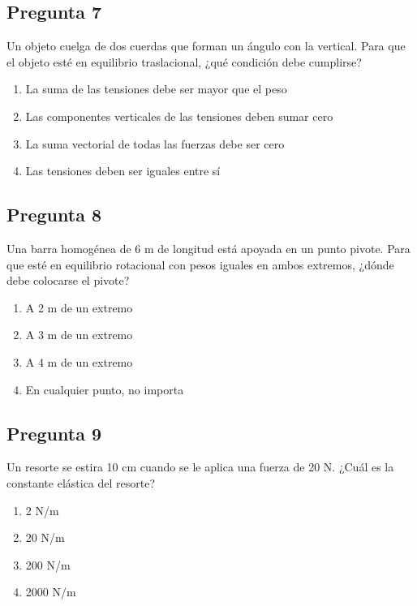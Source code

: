 \begin{preguntabox}
\subsection{Pregunta 7}
Un objeto cuelga de dos cuerdas que forman un ángulo con la vertical. Para que el objeto esté en equilibrio traslacional, ¿qué condición debe cumplirse?

\begin{enumerate}
    \item[A)] La suma de las tensiones debe ser mayor que el peso
    \item[B)] Las componentes verticales de las tensiones deben sumar cero
    \item[C)] La suma vectorial de todas las fuerzas debe ser cero
    \item[D)] Las tensiones deben ser iguales entre sí
\end{enumerate}
\end{preguntabox}

\begin{preguntabox}
\subsection{Pregunta 8}
Una barra homogénea de 6 m de longitud está apoyada en un punto pivote. Para que esté en equilibrio rotacional con pesos iguales en ambos extremos, ¿dónde debe colocarse el pivote?

\begin{enumerate}
    \item[A)] A 2 m de un extremo
    \item[B)] A 3 m de un extremo
    \item[C)] A 4 m de un extremo
    \item[D)] En cualquier punto, no importa
\end{enumerate}
\end{preguntabox}

\newpage

\begin{preguntabox}
\subsection{Pregunta 9}
Un resorte se estira 10 cm cuando se le aplica una fuerza de 20 N. ¿Cuál es la constante elástica del resorte?

\begin{enumerate}
    \item[A)] 2 N/m
    \item[B)] 20 N/m
    \item[C)] 200 N/m
    \item[D)] 2000 N/m
\end{enumerate}
\end{preguntabox}


